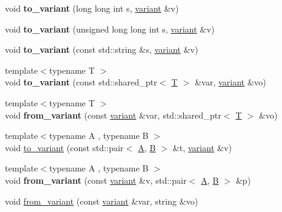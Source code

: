 \begin{DoxyCompactItemize}
\mbox{\label{namespacefc_ad4be388b372a3945cc2ab72a5b78a688}} 
void {\bfseries to\+\_\+variant} (long long int s, \mbox{\hyperlink{classfc_1_1variant}{variant}} \&v)
\item 
\mbox{\label{namespacefc_a16d95142144909e4e4903bc27763ab20}} 
void {\bfseries to\+\_\+variant} (unsigned long long int s, \mbox{\hyperlink{classfc_1_1variant}{variant}} \&v)
\item 
\mbox{\label{namespacefc_af4de7689d6599f575cdd784369346c30}} 
void {\bfseries to\+\_\+variant} (const std\+::string \&s, \mbox{\hyperlink{classfc_1_1variant}{variant}} \&v)
\item 
\mbox{\label{namespacefc_a0197118a18cc6cd334651fc533b53c9f}} 
{\footnotesize template$<$typename T $>$ }\\void {\bfseries to\+\_\+variant} (const std\+::shared\+\_\+ptr$<$ \mbox{\hyperlink{struct_t}{T}} $>$ \&var, \mbox{\hyperlink{classfc_1_1variant}{variant}} \&vo)
\item 
\mbox{\label{namespacefc_aa0ed0a473dc6a28eb6eb595c9ddb739d}} 
{\footnotesize template$<$typename T $>$ }\\void {\bfseries from\+\_\+variant} (const \mbox{\hyperlink{classfc_1_1variant}{variant}} \&var, std\+::shared\+\_\+ptr$<$ \mbox{\hyperlink{struct_t}{T}} $>$ \&vo)
\item 
{\footnotesize template$<$typename A , typename B $>$ }\\void \mbox{\hyperlink{namespacefc_aeab321dab5b5322bf879f7a752c0784a}{to\+\_\+variant}} (const std\+::pair$<$ \mbox{\hyperlink{struct_a}{A}}, \mbox{\hyperlink{struct_b}{B}} $>$ \&t, \mbox{\hyperlink{classfc_1_1variant}{variant}} \&v)
\item 
\mbox{\label{namespacefc_a993a25445580d0b2bde1ff05c05e535c}} 
{\footnotesize template$<$typename A , typename B $>$ }\\void {\bfseries from\+\_\+variant} (const \mbox{\hyperlink{classfc_1_1variant}{variant}} \&v, std\+::pair$<$ \mbox{\hyperlink{struct_a}{A}}, \mbox{\hyperlink{struct_b}{B}} $>$ \&p)
\item 
void \mbox{\hyperlink{namespacefc_a2f485ffc3e343bad1a005b535903babb}{from\+\_\+variant}} (const \mbox{\hyperlink{classfc_1_1variant}{variant}} \&var, string \&vo)

\end{DoxyCompactItemize}
